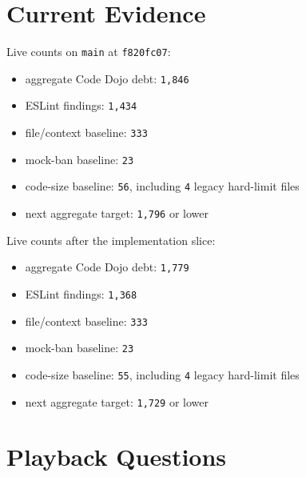 \section{Current Evidence}\label{record-221-current-evidence}

Live counts on \texttt{m\allowbreak{}a\allowbreak{}i\allowbreak{}n} at \texttt{f\allowbreak{}8\allowbreak{}2\allowbreak{}0\allowbreak{}f\allowbreak{}c\allowbreak{}0\allowbreak{}7}:

\begin{itemize}
\tightlist
\item
  aggregate Code Dojo debt: \texttt{1\allowbreak{},\allowbreak{}8\allowbreak{}4\allowbreak{}6}
\item
  ESLint findings: \texttt{1\allowbreak{},\allowbreak{}4\allowbreak{}3\allowbreak{}4}
\item
  file/context baseline: \texttt{3\allowbreak{}3\allowbreak{}3}
\item
  mock-ban baseline: \texttt{2\allowbreak{}3}
\item
  code-size baseline: \texttt{5\allowbreak{}6}, including \texttt{4} legacy hard-limit files
\item
  next aggregate target: \texttt{1\allowbreak{},\allowbreak{}7\allowbreak{}9\allowbreak{}6} or lower
\end{itemize}

Live counts after the implementation slice:

\begin{itemize}
\tightlist
\item
  aggregate Code Dojo debt: \texttt{1\allowbreak{},\allowbreak{}7\allowbreak{}7\allowbreak{}9}
\item
  ESLint findings: \texttt{1\allowbreak{},\allowbreak{}3\allowbreak{}6\allowbreak{}8}
\item
  file/context baseline: \texttt{3\allowbreak{}3\allowbreak{}3}
\item
  mock-ban baseline: \texttt{2\allowbreak{}3}
\item
  code-size baseline: \texttt{5\allowbreak{}5}, including \texttt{4} legacy hard-limit files
\item
  next aggregate target: \texttt{1\allowbreak{},\allowbreak{}7\allowbreak{}2\allowbreak{}9} or lower
\end{itemize}

\section{Playback Questions}\label{record-221-playback-questions}

